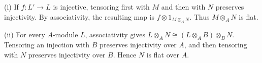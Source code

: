 (i) If $f:L'\to L$ is injective, tensoring first with $M$ and then with $N$ preserves injectivity. By associativity, the resulting map is $f\otimes1_{M\otimes_A N}$. Thus $M\otimes_A N$ is flat.

(ii) For every $A$-module $L$, associativity gives $L\otimes_A N\cong(L\otimes_A B)\otimes_B N$. Tensoring an injection with $B$ preserves injectivity over $A$, and then tensoring with $N$ preserves injectivity over $B$. Hence $N$ is flat over $A$.
